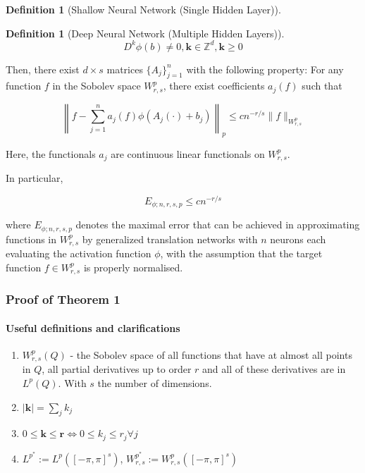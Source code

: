\documentclass[11pt,a4paper]{article}
\theoremstyle{plain}
\theoremstyle{definition}
\newtheorem{definition}[theorem]{Definition}
\theoremstyle{remark}
\begin{document}
\begin{definition}[Shallow Neural Network (Single Hidden Layer)]
\begin{definition}[Deep Neural Network (Multiple Hidden Layers)]
\begin{equation}
    D^k \phi(b) \neq 0, \mathbf{k} \in \mathbb{Z}^d, \mathbf{k} \geq 0
\end{equation}

Then, there exist \(d \times s\) matrices \(\{A_j\}_{j=1}^n\) with the following property: For any function \(f\) in the Sobolev space \(W^p_{r,s}\), there exist coefficients \(a_j(f)\) such that

\[ \left\| f - \sum_{j=1}^{n} a_j(f) \phi(A_j(\cdot) + b_{j}) \right\|_p \leq c n^{-r/s} \|f\|_{W^{p}_{r,s}} \]

Here, the functionals \(a_j\) are continuous linear functionals on \(W^p_{r,s}\).

In particular, 

\[ E_{\phi;n,r,s,p} \leq c n^{-r/s} \]

where \( E_{\phi;n,r,s,p} \) denotes the maximal error that can be achieved in approximating functions in \(W^p_{r,s}\) by generalized translation networks with \(n\) neurons each evaluating the activation function \(\phi \), with the assumption that the target function \(f \in W^p_{r,s}\) is properly normalised.

\subsubsection{Proof of Theorem 1}


\paragraph{Useful definitions and clarifications} 

\begin{enumerate}
    \item \(W^{p}_{r,s} (Q)\) - the Sobolev space of all functions that have at almost all points in \(Q\), all partial derivatives up to order \(r\) and all of these derivatives are in \(L^p(Q)\). With \(s\) the number of dimensions.
    \item \(\left\vert \mathbf{k}  \right\vert = \sum_{j} k_{j}\)
    \item  \(0 \leq \mathbf{k} \leq \mathbf{r}  \iff 0 \leq k_{j}\leq r_{j} \forall j\) 
    \item \(L^{p^{\ast} } := L^{p}([-\pi ,\pi ]^s) \), \(W^{p^{\ast} }_{r,s} := W^{p}_{r,s} ([-\pi ,\pi ]^s)\) 


\end{enumerate}
\end{definition}
\end{definition}
\end{document}
